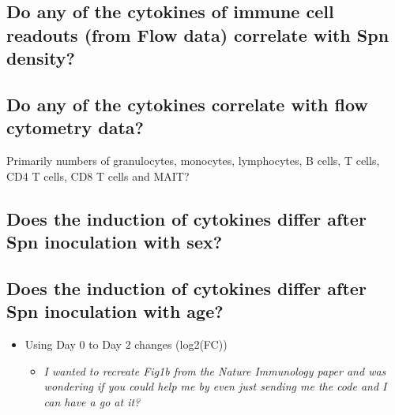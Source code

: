 \documentclass[
]{book}
\providecommand{\tightlist}{%
  \setlength{\itemsep}{0pt}\setlength{\parskip}{0pt}}
\begin{document}
\hypertarget{do-any-of-the-cytokines-of-immune-cell-readouts-from-flow-data-correlate-with-spn-density}{%
\subsection{Do any of the cytokines of immune cell readouts (from Flow data) correlate with Spn density?}\label{do-any-of-the-cytokines-of-immune-cell-readouts-from-flow-data-correlate-with-spn-density}}

\hypertarget{do-any-of-the-cytokines-correlate-with-flow-cytometry-data}{%
\subsection{Do any of the cytokines correlate with flow cytometry data?}\label{do-any-of-the-cytokines-correlate-with-flow-cytometry-data}}

Primarily numbers of granulocytes, monocytes, lymphocytes, B cells, T cells, CD4 T cells, CD8 T cells and MAIT?

\hypertarget{does-the-induction-of-cytokines-differ-after-spn-inoculation-with-sex}{%
\subsection{Does the induction of cytokines differ after Spn inoculation with sex?}\label{does-the-induction-of-cytokines-differ-after-spn-inoculation-with-sex}}

\hypertarget{does-the-induction-of-cytokines-differ-after-spn-inoculation-with-age}{%
\subsection{Does the induction of cytokines differ after Spn inoculation with age?}\label{does-the-induction-of-cytokines-differ-after-spn-inoculation-with-age}}

\begin{itemize}
\item
  Using Day 0 to Day 2 changes (log2(FC))

  \begin{itemize}
  \tightlist
  \item
    \emph{I wanted to recreate Fig1b from the Nature Immunology paper and was wondering if you could help me by even just sending me the code and I can have a go at it?}
  \end{itemize}
\end{itemize}
\end{document}
